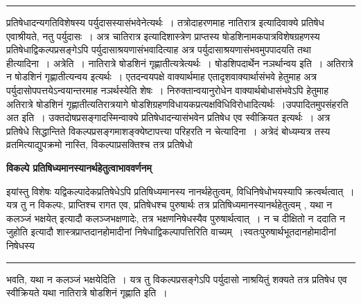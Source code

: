 \documentclass[11pt, openany]{book}
\newcommand\alfootnote[1]{%
  \begingroup
  \renewcommand\thefootnoteA{}\footnoteA{#1}%
  \addtocounter{footnoteA}{-1}%
  \endgroup
}
\begin{document}
\hrule
\vspace{3mm}
\noindent
प्रतिषेधादन्यगतिविशेषस्य पर्युदासस्यासंभवेनेत्यर्थः~। तत्रोदाहरणमाह नातिरात्र इत्यादिवाक्ये प्रतिषेध एवाश्रीयते, नतु पर्युदासः~। अत्र
चातिरात्र  इत्यादिशास्त्रेण प्राप्तस्य षोडशिनामकपात्रविशेषग्रहणस्य प्रतिषेधाद्विकल्पप्रसङ्गेऽपि  पर्युदासाश्रयणासंभवादित्याह  अत्र
पर्युदासाश्रयणासंभवमुपपादयति {\br तथा हीत्यादिना~। अत्रेति~।} नातिरात्रे षोडशिनं  गृह्णातीत्यत्रेत्यर्थः~। {\br षोडशिपदार्थेन नञर्थान्वय इति~।} अतिरात्रे न
षोडशिनं गृह्णातीत्यन्वय इत्यर्थः~। एतदन्वयपक्षे वाक्यार्थमाह  एतादृशवाक्यार्थासंभवे हेतुमाह अत्र पर्युदासोपपत्तयेऽन्वयान्तरमाह नञर्थस्येति शेषः~। निरुक्तान्वयानुरोधेन वाक्यार्थबोधासंभवेऽपि हेतुमाह अतिरात्रे षोडशिनं गृह्णातीत्यतिरात्रयागे षोडशिग्रहणविधायकप्रत्यक्षविधिविरोधादित्यर्थः~।उपपादितमुपसंहरति {\br अत इति~।} उक्तदोषप्रसङ्गादस्मिन्वाक्ये प्रतिषेधादन्यासंभवेन प्रतिषेध एव स्वीक्रियत इत्यर्थः~। अत्र प्रतिषेधे सिद्धान्तिते विकल्पप्रसङ्गमाशङ्क्येष्टापत्त्या परिहरति {\br न चेत्यादिना~।} अत्रेदं बोध्यम्\textendash यत्र तस्य व्रतमित्याद्युपक्रमो नास्ति,
\footnotemarkA[1]विकल्पाप्रसक्तिश्च तत्र प्रतिषेधो 
\alfootnote{टिप्प०\textemdash\ $^{1}$अत्रास्तीति शेषः~।}
\newpage
\fancyhead[LO]{[ वि०प्र०हेतु०वर्णनम् ]}
 \begin{center}
 \textbf{विकल्पे प्रतिषिध्यमानस्यानर्थहेतुत्वाभाववर्णनम् }
 \end{center}
 
{\bl इयांस्तु विशेषः यद्विकल्पादेकप्रतिषेधेऽपि प्रतिषिध्यमानस्य नानर्थहेतुत्वम्, विधिनिषेधोभयस्यापि क्रत्वर्थत्वात्~। यत्र तु न विकल्पः, प्राप्तिश्च रागत एव, प्रतिषेधश्च पुरुषार्थः तत्र प्रतिषिध्यमानस्यानर्थहेतुत्वम् , यथा {\qtl न कलञ्जं भक्षयेत्}  इत्यादौ कलञ्जभक्षणादेः, तत्र भक्षणनिषेधस्यैव पुरुषार्थत्वात्~। न च {\qtl दीक्षितो न  ददाति न जुहोति} इत्यादौ शास्त्रप्राप्तदानहोमादीनां निषेधाद्विकल्पापत्तिरिति वाच्यम्~।स्वतःपुरुषार्थभूतदानहोमादीनां निषेधस्य }\\
\hrule
\vspace{3mm}
\noindent
भवति, यथा न कलञ्जं भक्षयेदिति~। यत्र तु विकल्पप्रसङ्गेऽपि पर्युदासो नाश्रयितुं  शक्यते तत्र प्रतिषेध एव स्वीक्रियते यथा {\qt नातिरात्रे षोडशिनं गृह्णाति} इति~।\\
\end{document}
